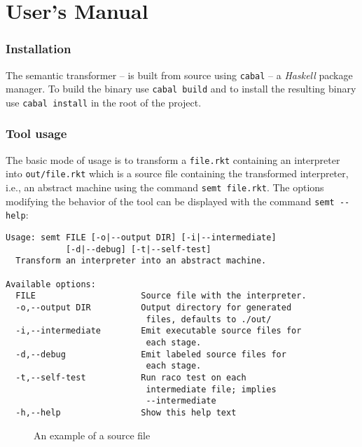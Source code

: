 \chapter{User's Manual}\label{chapter:user-manual}
\subsection*{Installation}
The semantic transformer -- \semt{} is built from source using \lstinline!cabal! -- a \textit{Haskell} package manager.
To build the binary use \lstinline!cabal build! and to install the resulting binary use \lstinline!cabal install! in the root of the project.

\subsection*{Tool usage}
The basic mode of usage is to transform a \lstinline!file.rkt! containing an interpreter into \lstinline!out/file.rkt! which is a source file containing the transformed interpreter, i.e., an abstract machine using the command \lstinline!semt file.rkt!.
The options modifying the behavior of the tool can be displayed with the command \lstinline!semt --help!:
\begin{lstlisting}
Usage: semt FILE [-o|--output DIR] [-i|--intermediate] 
            [-d|--debug] [-t|--self-test]
  Transform an interpreter into an abstract machine.

Available options:
  FILE                     Source file with the interpreter.
  -o,--output DIR          Output directory for generated
                            files, defaults to ./out/
  -i,--intermediate        Emit executable source files for
                            each stage.
  -d,--debug               Emit labeled source files for
                            each stage.
  -t,--self-test           Run raco test on each
                            intermediate file; implies
                            --intermediate
  -h,--help                Show this help text
\end{lstlisting}

\begin{figure}
  
  \caption{An example of a source file}
  \label{fig:idl-example}
\end{figure}

